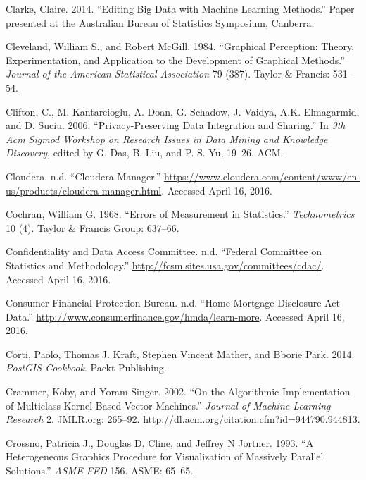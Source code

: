 \documentclass[]{krantz}
\begin{document}
\hypertarget{ref-Clarke2014}{}
Clarke, Claire. 2014. ``Editing Big Data with Machine Learning
Methods.'' Paper presented at the Australian Bureau of Statistics
Symposium, Canberra.

\hypertarget{ref-cleveland1984graphical}{}
Cleveland, William S., and Robert McGill. 1984. ``Graphical Perception:
Theory, Experimentation, and Application to the Development of Graphical
Methods.'' \emph{Journal of the American Statistical Association} 79
(387). Taylor \& Francis: 531--54.

\hypertarget{ref-Clifton06}{}
Clifton, C., M. Kantarcioglu, A. Doan, G. Schadow, J. Vaidya, A.K.
Elmagarmid, and D. Suciu. 2006. ``Privacy-Preserving Data Integration
and Sharing.'' In \emph{9th Acm Sigmod Workshop on Research Issues in
Data Mining and Knowledge Discovery}, edited by G. Das, B. Liu, and P.
S. Yu, 19--26. ACM.

\hypertarget{ref-ClouderaManager}{}
Cloudera. n.d. ``Cloudera Manager.''
\url{https://www.cloudera.com/content/www/en-us/products/cloudera-manager.html}.
Accessed April 16, 2016.

\hypertarget{ref-cochran1968errors}{}
Cochran, William G. 1968. ``Errors of Measurement in Statistics.''
\emph{Technometrics} 10 (4). Taylor \& Francis Group: 637--66.

\hypertarget{ref-ConfidentialityandDataAccessCommittee}{}
Confidentiality and Data Access Committee. n.d. ``Federal Committee on
Statistics and Methodology.''
\url{http://fcsm.sites.usa.gov/committees/cdac/}. Accessed April 16,
2016.

\hypertarget{ref-HDMA}{}
Consumer Financial Protection Bureau. n.d. ``Home Mortgage Disclosure
Act Data.'' \url{http://www.consumerfinance.gov/hmda/learn-more}.
Accessed April 16, 2016.

\hypertarget{ref-PostGISCookbook}{}
Corti, Paolo, Thomas J. Kraft, Stephen Vincent Mather, and Bborie Park.
2014. \emph{PostGIS Cookbook}. Packt Publishing.

\hypertarget{ref-crammer2002}{}
Crammer, Koby, and Yoram Singer. 2002. ``On the Algorithmic
Implementation of Multiclass Kernel-Based Vector Machines.''
\emph{Journal of Machine Learning Research} 2. JMLR.org: 265--92.
\url{http://dl.acm.org/citation.cfm?id=944790.944813}.

\hypertarget{ref-crossno1993heterogeneous}{}
Crossno, Patricia J., Douglas D. Cline, and Jeffrey N Jortner. 1993. ``A
Heterogeneous Graphics Procedure for Visualization of Massively Parallel
Solutions.'' \emph{ASME FED} 156. ASME: 65--65.
\end{document}
